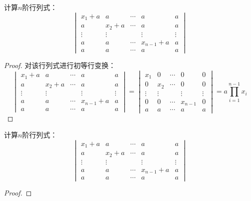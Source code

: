 \begin{problem}
计算\(n\)阶行列式：
\begin{equation*}
    \begin{vmatrix}
        x_{1}+a & a       & \cdots & a         & a      \\
        a       & x_{2}+a & \cdots & a         & a      \\
        \vdots  & \vdots  &        & \vdots    & \vdots \\
        a       & a       & \cdots & x_{n-1}+a & a      \\
        a       & a       & \cdots & a         & a
    \end{vmatrix}
\end{equation*}
\end{problem}
\begin{proof}
    对该行列式进行初等行变换：
    \begin{equation*}
        \begin{vmatrix}
            x_{1}+a & a       & \cdots & a         & a      \\
            a       & x_{2}+a & \cdots & a         & a      \\
            \vdots  & \vdots  &        & \vdots    & \vdots \\
            a       & a       & \cdots & x_{n-1}+a & a      \\
            a       & a       & \cdots & a         & a
        \end{vmatrix}=
        \begin{vmatrix}
            x_{1}  & 0      & \cdots & 0       & 0      \\
            0      & x_{2}  & \cdots & 0       & 0      \\
            \vdots & \vdots &        & \vdots  & \vdots \\
            0      & 0      & \cdots & x_{n-1} & 0      \\
            a      & a      & \cdots & a       & a
        \end{vmatrix}=a\prod_{i=1}^{n-1}x_i
    \end{equation*}
\end{proof}

\begin{problem}
计算\(n\)阶行列式：
\begin{equation*}
    \begin{vmatrix}
        x_1+a  & a      & \cdots & a         & a      \\
        a      & x_2+a  & \cdots & a         & a      \\
        \vdots & \vdots &        & \vdots    & \vdots \\
        a      & a      & \cdots & x_{n-1}+a & a      \\
        a      & a      & \cdots & a         & a
    \end{vmatrix}
\end{equation*}
\end{problem}
\begin{proof}
\end{proof}

